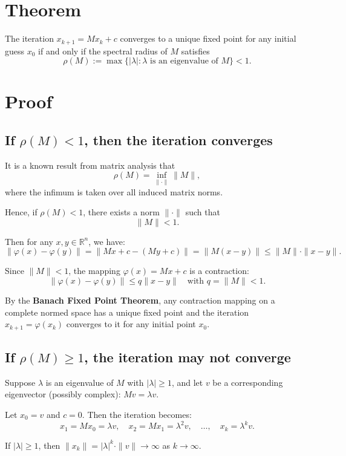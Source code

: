 \documentclass[12pt]{article}
\begin{document}
\section*{Theorem}

The iteration $x_{k+1} = Mx_k + c$ converges to a unique fixed point for any initial guess $x_0$ if and only if the spectral radius of $M$ satisfies
\[
\rho(M) := \max \{ |\lambda| : \lambda \text{ is an eigenvalue of } M \} < 1.
\]

\section*{Proof}

\subsection*{If $\rho(M) < 1$, then the iteration converges}

It is a known result from matrix analysis that
\[
\rho(M) = \inf_{\|\cdot\|} \|M\|,
\]
where the infimum is taken over all induced matrix norms.

Hence, if $\rho(M) < 1$, there exists a norm $\|\cdot\|$ such that
\[
\|M\| < 1.
\]

Then for any $x, y \in \mathbb{R}^n$, we have:
\[
\|\varphi(x) - \varphi(y)\| = \|Mx + c - (My + c)\| = \|M(x - y)\| \leq \|M\| \cdot \|x - y\|.
\]

Since $\|M\| < 1$, the mapping $\varphi(x) = Mx + c$ is a contraction:
\[
\|\varphi(x) - \varphi(y)\| \leq q \|x - y\| \quad \text{with } q = \|M\| < 1.
\]

By the \textbf{Banach Fixed Point Theorem}, any contraction mapping on a complete normed space has a unique fixed point and the iteration $x_{k+1} = \varphi(x_k)$ converges to it for any initial point $x_0$.

\subsection*{If $\rho(M) \geq 1$, the iteration may not converge}

Suppose $\lambda$ is an eigenvalue of $M$ with $|\lambda| \geq 1$, and let $v$ be a corresponding eigenvector (possibly complex): $Mv = \lambda v$.

Let $x_0 = v$ and $c = 0$. Then the iteration becomes:
\[
x_1 = Mx_0 = \lambda v, \quad
x_2 = Mx_1 = \lambda^2 v, \quad
\ldots, \quad
x_k = \lambda^k v.
\]

If $|\lambda| \geq 1$, then $\|x_k\| = |\lambda|^k \cdot \|v\| \to \infty$ as $k \to \infty$.
\end{document}
